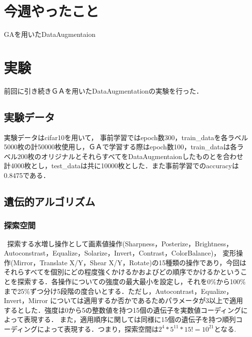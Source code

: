 \documentclass[twocolumn]{jarticle}     %
\begin{document}

\section{今週やったこと}
 GAを用いたDataAugmentaion

\section{実験}
前回に引き続きＧＡを用いたDataAugmentationの実験を行った．

\subsection{実験データ}
実験データはcifar10を用いて，
事前学習ではepoch数300，train\_dataを各ラベル5000枚の計50000枚使用し，ＧＡで学習する際はepoch数100，train\_dataは各ラベル200枚のオリジナルとそれらすべてをDataAugmentaionしたものとを合わせ計4000枚とし，test\_dataは共に10000枚とした．また事前学習でのaccuracyは0.8475である．
\subsection{遺伝的アルゴリズム}


\subsubsection{探索空間}
\ 探索する水増し操作として画素値操作(Sharpness，Posterize，Brightness，Autoconstrast，Equalize，Solarize，Invert，Contrast，ColorBalance)，
変形操作(Mirror，Translate X/Y，Shear X/Y，Rotate)の15種類の操作であり，今回はそれらすべてを個別にどの程度強くかけるかおよびどの順序でかけるかということを探索する．各操作についての強度の最大最小を設定し，それを0\%から100\%まで25\%ずつ分け5段階の度合いとする．ただし，Autocontrast，Equalize，Invert，Mirror については適用するか否かであるためパラメータが3以上で適用するとした．強度は0から5の整数値を持つ15個の遺伝子を実数値コーディングによって表現する．
また，適用順序に関しては同様に15個の遺伝子を持つ順列コーディングによって表現する．つまり，探索空間は$2^4*5^{11}*15!=10^{21}$となる.
\end{document}
